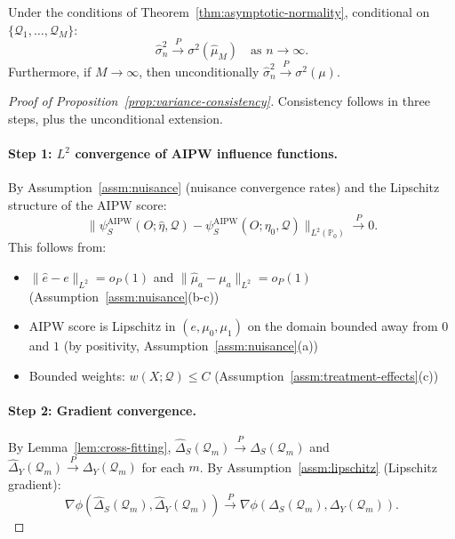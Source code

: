 \begin{proposition}
\label{prop:variance-consistency}
Under the conditions of Theorem~\ref{thm:asymptotic-normality}, conditional on $\{\mathcal{Q}_1, \ldots, \mathcal{Q}_M\}$:
\begin{equation}
\hat{\sigma}^2_n \xrightarrow{P} \sigma^2(\hat{\mu}_M) \quad \text{as } n \to \infty.
\end{equation}
Furthermore, if $M \to \infty$, then unconditionally $\hat{\sigma}^2_n \xrightarrow{P} \sigma^2(\mu)$.
\end{proposition}

\begin{proof}[Proof of Proposition~\ref{prop:variance-consistency}]
Consistency follows in three steps, plus the unconditional extension.

\paragraph{Step 1: $L^2$ convergence of AIPW influence functions.}
By Assumption~\ref{assm:nuisance} (nuisance convergence rates) and the Lipschitz structure of the AIPW score:
\begin{equation}
\|\psi_S^{\text{AIPW}}(O; \hat{\eta}, \mathcal{Q}) - \psi_S^{\text{AIPW}}(O; \eta_0, \mathcal{Q})\|_{L^2(\mathbb{P}_0)} \xrightarrow{P} 0.
\end{equation}
This follows from:
\begin{itemize}
\item $\|\hat{e} - e\|_{L^2} = o_P(1)$ and $\|\hat{\mu}_a - \mu_a\|_{L^2} = o_P(1)$ (Assumption~\ref{assm:nuisance}(b-c))
\item AIPW score is Lipschitz in $(e, \mu_0, \mu_1)$ on the domain bounded away from $0$ and $1$ (by positivity, Assumption~\ref{assm:nuisance}(a))
\item Bounded weights: $w(X; \mathcal{Q}) \leq C$ (Assumption~\ref{assm:treatment-effects}(c))
\end{itemize}

\paragraph{Step 2: Gradient convergence.}
By Lemma~\ref{lem:cross-fitting}, $\hat{\Delta}_S(\mathcal{Q}_m) \xrightarrow{P} \Delta_S(\mathcal{Q}_m)$ and $\hat{\Delta}_Y(\mathcal{Q}_m) \xrightarrow{P} \Delta_Y(\mathcal{Q}_m)$ for each $m$. By Assumption~\ref{assm:lipschitz} (Lipschitz gradient):
\begin{equation}
\nabla\phi(\hat{\Delta}_S(\mathcal{Q}_m), \hat{\Delta}_Y(\mathcal{Q}_m)) \xrightarrow{P} \nabla\phi(\Delta_S(\mathcal{Q}_m), \Delta_Y(\mathcal{Q}_m)).
\end{equation}


\end{proof}
